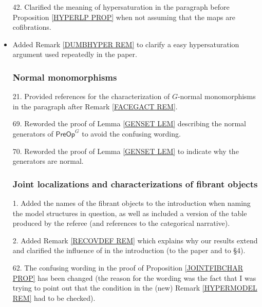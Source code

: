 \documentclass{article}
\begin{document}
\begin{itemize}
\item[42.] Clarified the meaning of hypersaturation in the paragraph before Proposition \ref{HYPERLP PROP} when not assuming that the maps are cofibrations. %

\item Added Remark \ref{DUMBHYPER REM} to clarify a easy hypersaturation argument used repeatedly in the paper.      

      

      
      \subsubsection*{Normal monomorphisms}      
      
\item[21.] Provided references for the characterization of $G$-normal monomorphisms in the paragraph after Remark \ref{FACEGACT REM}. %
      
\item[69.] Reworded the proof of Lemma \ref{GENSET LEM} describing the normal generators of $\mathsf{PreOp}^G$ to avoid the confusing wording. %

\item[70.] Reworded the proof of Lemma \ref{GENSET LEM} to indicate why the generators are normal. %
 


      

      \subsubsection*{Joint localizations and characterizations of fibrant objects}
\item[1.] Added the names of the fibrant objects to the introduction when naming the model structures in question, as well as included a version of the table produced by the referee (and references to the categorical narrative).
      
\item[2.] Added Remark \ref{RECOVDEF REM} which explains why our results extend \cite[Thm. 6.6]{CM13a} and clarified the influence of \cite[Thm. 6.6]{CM13a} in the introduction (to the paper and to \S 4). %
      
\item[62.] The confusing wording in the proof of Proposition \ref{JOINTFIBCHAR PROP} has been changed (the reason for the wording was the fact that I was trying to point out that the condition in the (new) Remark \ref{HYPERMODEL REM} had to be checked).
      

\end{itemize}
\end{document}

